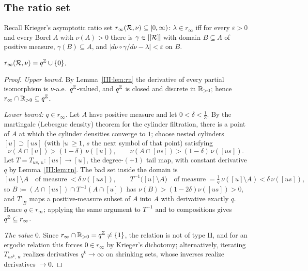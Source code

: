 \subsection{The ratio set}

Recall Krieger's asymptotic ratio set $r_\infty(\mathcal{R},\nu)\subseteq[0,\infty)$:
$\lambda\in r_\infty$ iff for every $\varepsilon>0$ and every Borel $A$ with
$\nu(A)>0$ there is $\gamma\in[[\mathcal{R}]]$ with domain $B\subseteq A$ of positive measure,
$\gamma(B)\subseteq A$, and $|d\nu\circ\gamma/d\nu-\lambda|<\varepsilon$ on $B$.

\begin{theorem}\label{III:thm:ratio}
$r_\infty(\mathcal{R},\nu)=q^{\mathbb{Z}}\cup\{0\}$.
\end{theorem}

\begin{proof}
\emph{Upper bound.} By Lemma~\ref{III:lem:rn} the derivative of every partial isomorphism
is $\nu$-a.e.\ $q^{\mathbb{Z}}$-valued, and $q^{\mathbb{Z}}$ is closed and discrete in $\mathbb{R}_{>0}$; hence
$r_\infty\cap\mathbb{R}_{>0}\subseteq q^{\mathbb{Z}}$.

\emph{Lower bound: $q\in r_\infty$.} Let $A$ have positive measure and let
$0<\delta<\tfrac13$. By the martingale (Lebesgue density) theorem for the cylinder
filtration, there is a point of $A$ at which the cylinder densities converge to $1$;
choose nested cylinders $[u]\supset[us]$ (with $|u|\ge1$, $s$ the next symbol of that
point) satisfying
\[
\nu(A\cap[u])>(1-\delta)\,\nu([u]),\qquad
\nu(A\cap[us])>(1-\delta)\,\nu([us]).
\]
Let $T=T_{us,\,u}\colon[us]\to[u]$, the degree-$(+1)$ tail map, with constant
derivative $q$ by Lemma~\ref{III:lem:rn}. The bad set inside the domain is
\[
[us]\setminus A\quad\text{of measure}\;<\delta\,\nu([us]),
\qquad
T^{-1}\bigl([u]\setminus A\bigr)\quad\text{of measure}\;
=\tfrac1q\,\nu([u]\setminus A)<\delta\,\nu([us]),
\]
so $B:=(A\cap[us])\cap T^{-1}(A\cap[u])$ has $\nu(B)>(1-2\delta)\nu([us])>0$, and
$T|_B$ maps a positive-measure subset of $A$ into $A$ with derivative exactly $q$.
Hence $q\in r_\infty$; applying the same argument to $T^{-1}$ and to compositions
gives $q^{\mathbb{Z}}\subseteq r_\infty$.

\emph{The value $0$.} Since $r_\infty\cap\mathbb{R}_{>0}=q^{\mathbb{Z}}\neq\{1\}$, the relation is not
of type II, and for an ergodic relation this forces $0\in r_\infty$ by Krieger's
dichotomy; alternatively, iterating $T_{us^k,\,u}$ realizes derivatives $q^{k}\to\infty$
on shrinking sets, whose inverses realize derivatives $\to0$.
\end{proof}

